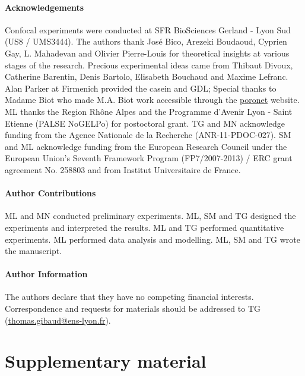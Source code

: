 \documentclass[twocolumn,superscriptaddress,showpacs,preprintnumbers,
amsmath,amssymb,prl]{revtex4-1}
\begin{document}



\paragraph*{Acknowledgements}
Confocal experiments were conducted at SFR BioSciences Gerland - Lyon Sud (US8 / UMS3444).
The authors thank Jos\'e Bico, Arezeki Boudaoud, Cyprien Gay, L. Mahadevan and Olivier Pierre-Louis for theoretical insights at various stages of the research. 
Precious experimental ideas came from Thibaut Divoux, Catherine Barentin, Denis Bartolo, Elisabeth Bouchaud and Maxime Lefranc.
Alan Parker at Firmenich provided the casein and GDL; 
Special thanks to Madame Biot who made M.A. Biot work accessible through the \href{http://www.olemiss.edu/sciencenet/poronet/}{poronet} website. 
ML thanks the Region Rhône Alpes and the Programme d'Avenir Lyon - Saint Etienne (PALSE NoGELPo) for postoctoral grant. 
TG and MN acknowledge funding from the Agence Nationale de la Recherche (ANR-11-PDOC-027). 
SM and ML acknowledge funding from the European Research Council under the European Union's Seventh Framework Program (FP7/2007-2013) / ERC grant agreement No. 258803 and from Institut Universitaire de France.


\paragraph*{Author Contributions}
ML and MN conducted preliminary experiments. ML, SM and TG designed the experiments and interpreted the results. ML and TG performed quantitative experiments. ML performed data analysis and modelling. ML, SM and TG wrote the manuscript.


\paragraph*{Author Information} 
The authors declare that they have no competing financial interests. 
Correspondence and requests for materials should be addressed to TG (\href{mailto:thomas.gibaud@ens-lyon.fr}{thomas.gibaud@ens-lyon.fr}).






\clearpage
\newpage
\setcounter{figure}{0}

\section*{Supplementary material}
\end{document}
